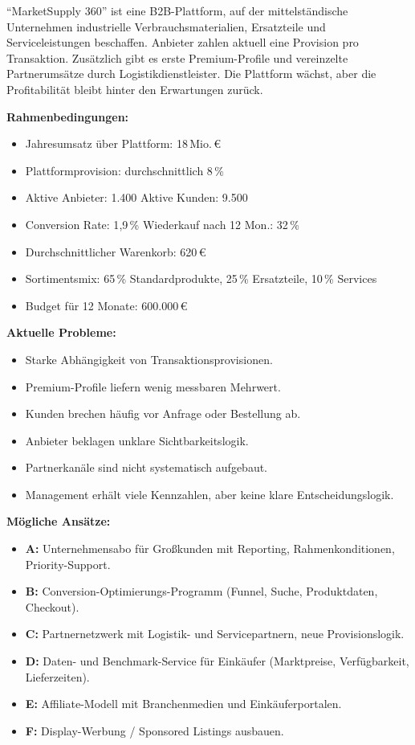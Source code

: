 \documentclass[11pt,a4paper,oneside]{article}
\begin{document}
\begin{infobox}
``MarketSupply 360'' ist eine B2B-Plattform, auf der mittelständische Unternehmen industrielle Verbrauchsmaterialien, Ersatzteile und Serviceleistungen beschaffen. Anbieter zahlen aktuell eine Provision pro Transaktion. Zusätzlich gibt es erste Premium-Profile und vereinzelte Partnerumsätze durch Logistikdienstleister. Die Plattform wächst, aber die Profitabilität bleibt hinter den Erwartungen zurück.

\smallskip
\textbf{Rahmenbedingungen:}
\begin{itemize}
  \item Jahresumsatz über Plattform: 18\,Mio.\,\euro
  \item Plattformprovision: durchschnittlich 8\,\%
  \item Aktive Anbieter: 1.400 \textperiodcentered{} Aktive Kunden: 9.500
  \item Conversion Rate: 1{,}9\,\% \textperiodcentered{} Wiederkauf nach 12 Mon.: 32\,\%
  \item Durchschnittlicher Warenkorb: 620\,\euro
  \item Sortimentsmix: 65\,\% Standardprodukte, 25\,\% Ersatzteile, 10\,\% Services
  \item Budget für 12 Monate: 600.000\,\euro
\end{itemize}

\smallskip
\textbf{Aktuelle Probleme:}
\begin{itemize}
  \item Starke Abhängigkeit von Transaktionsprovisionen.
  \item Premium-Profile liefern wenig messbaren Mehrwert.
  \item Kunden brechen häufig vor Anfrage oder Bestellung ab.
  \item Anbieter beklagen unklare Sichtbarkeitslogik.
  \item Partnerkanäle sind nicht systematisch aufgebaut.
  \item Management erhält viele Kennzahlen, aber keine klare Entscheidungslogik.
\end{itemize}

\smallskip
\textbf{Mögliche Ansätze:}
\begin{itemize}
  \item \textbf{A:} Unternehmensabo für Großkunden mit Reporting, Rahmenkonditionen, Priority-Support.
  \item \textbf{B:} Conversion-Optimierungs-Programm (Funnel, Suche, Produktdaten, Checkout).
  \item \textbf{C:} Partnernetzwerk mit Logistik- und Servicepartnern, neue Provisionslogik.
  \item \textbf{D:} Daten- und Benchmark-Service für Einkäufer (Marktpreise, Verfügbarkeit, Lieferzeiten).
  \item \textbf{E:} Affiliate-Modell mit Branchenmedien und Einkäuferportalen.
  \item \textbf{F:} Display-Werbung / Sponsored Listings ausbauen.
\end{itemize}
\end{infobox}
\end{document}
